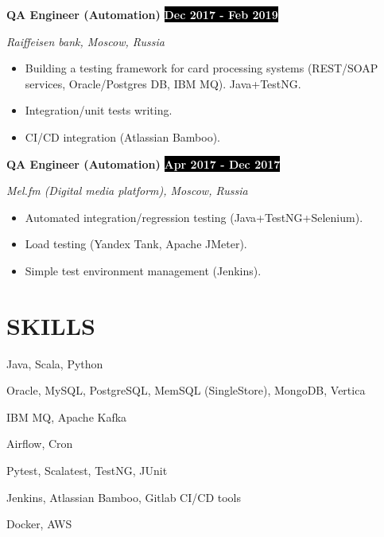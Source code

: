 \documentclass[11pt,a4paper]{article}
\newcommand{\timeperiod}[1]{%
    \hfill{\small\colorbox{black}{\textcolor{white}{\textbf{#1}}}}\par%
}
\newcommand{\jobsep}{\vspace{1.5em}}
\begin{document}
\jobsep
\textbf{QA Engineer (Automation)}\timeperiod{Dec 2017 - Feb 2019}
\textit{Raiffeisen bank, Moscow, Russia}
\begin{itemize}
    \item Building a testing framework for card processing systems (REST/SOAP services, Oracle/Postgres DB, IBM MQ). Java+TestNG.
    \item Integration/unit tests writing.
    \item CI/CD integration (Atlassian Bamboo).
\end{itemize}

\jobsep
\textbf{QA Engineer (Automation)}\timeperiod{Apr 2017 - Dec 2017}
\textit{Mel.fm (Digital media platform), Moscow, Russia}
\begin{itemize}
    \item Automated integration/regression testing (Java+TestNG+Selenium).
    \item Load testing (Yandex Tank, Apache JMeter).
    \item Simple test environment management (Jenkins).
\end{itemize}

\section{SKILLS}
\begin{description}[labelwidth=1.5cm,leftmargin=!]
    \item[Languages] Java, Scala, Python
    \item[DBs] Oracle, MySQL, PostgreSQL, MemSQL (SingleStore), MongoDB, Vertica
    \item[MQs] IBM MQ, Apache Kafka
    \item[Schedulers] Airflow, Cron
    \item[Testing] Pytest, Scalatest, TestNG, JUnit
    \item[CI/CD tools] Jenkins, Atlassian Bamboo, Gitlab CI/CD tools
    \item[Other] Docker, AWS
\end{description}
\end{document}
